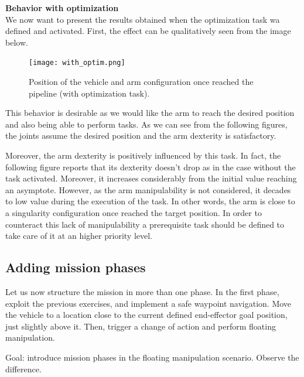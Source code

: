 \documentclass{article}
\begin{document}
{\large \textbf{Behavior with optimization}} \\
We now want to present the results obtained when the optimization task wa defined and activated. First, the effect can be qualitatively seen from the image below. \\
\begin{figure}[H]
	\centering
	{\texttt{[image: with\_optim.png]}}
	\caption{Position of the vehicle and arm configuration once reached the pipeline (with optimization task).}
	\label{im:optim}
\end{figure}
This behavior is desirable as we would like the arm to reach the desired position and also being able to perform tasks. As we can see from the following figures, the joints assume the desired position and the arm dexterity is satisfactory. 
\begin{figure}[H]
	\centering
	\hspace{10mm}
	\hspace{10mm}
	\label{im:With_optim_results}
\end{figure} 
Moreover, the arm dexterity is positively influenced by this task. In fact, the following figure reports that its dexterity doesn't drop as in the case without the task activated. Moreover, it increases considerably from the initial value reaching an asymptote. However, as the arm manipulability is not considered, it decades to low value during the execution of the task. In other words, the arm is close to a singularity configuration once reached the target position. In order to counteract this lack of manipulability a prerequisite task should be defined to take care of it at an higher priority level.


\subsection{Adding mission phases}
Let us now structure the mission in more than one phase. In the first phase, exploit the previous exercises, and implement a safe waypoint navigation. Move the vehicle to a location close to the current defined end-effector goal position, just slightly above it. Then, trigger a change of action and perform floating manipulation.

Goal: introduce mission phases in the floating manipulation scenario. Observe the difference.
\end{document}
